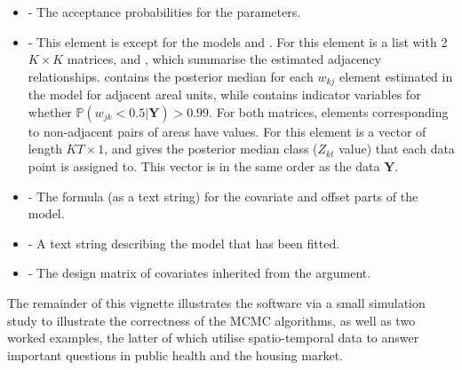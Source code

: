 \documentclass[article, nojss]{jss}
\begin{document}
\begin{itemize}
\item {} - The acceptance probabilities for the parameters.

\item {} - This element is  except for the models  and . For  this element is a list with 2 $K \times K$ matrices,  and , which summarise the estimated adjacency relationships.  contains the posterior median for each $w_{kj}$ element estimated in the model for adjacent areal units, while  contains indicator variables for whether $\mathbb{P}(w_{jk} < 0.5|\mathbf{Y})>0.99$. For both matrices, elements corresponding to non-adjacent pairs of areas have  values. For  this element is a vector of length $KT\times 1$, and gives the posterior median class ($Z_{kt}$ value) that each data point is assigned to. This vector is in the same order as the data $\mathbf{Y}$.
        
\item {} - The formula (as a text string) for the covariate and offset parts of the model.

\item {} - A text string describing the model that has been fitted.

\item {} - The design matrix of covariates inherited from the  argument.
\end{itemize}



The remainder of this vignette illustrates the  software via a small simulation study to illustrate the correctness of the MCMC algorithms, as well as  two worked examples, the latter of which utilise spatio-temporal data to answer important questions in public health and the housing market.


\end{document}

